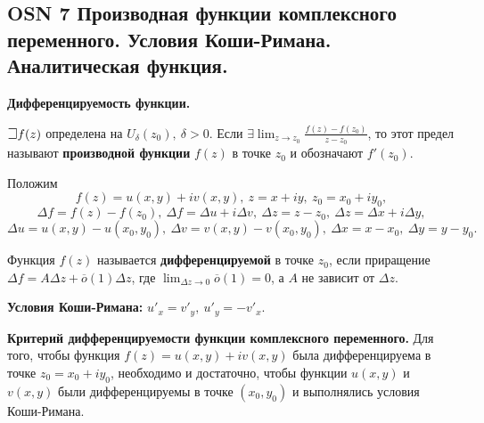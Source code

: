 \subsection*{OSN 7 Производная функции комплексного переменного. Условия Коши-Римана. Аналитическая  функция.}

\textbf{Дифференцируемость функции.}

$\mathLet f(z)$ определена на $U_{\delta}(z_0),~\delta > 0$. Если $\exists \displaystyle\lim_{z\to z_0} \frac{f(z) - f(z_0)}{z - z_0}$,
то этот предел называют \textbf{производной функции} $f(z)$ в точке $z_0$ и обозначают $f'(z_0)$.

Положим $$f(z) = u(x, y) + iv(x, y),~z = x + iy,~z_0 = x_0 + iy_0,$$
$$\Delta f = f(z)-f(z_0),~\Delta f = \Delta u + i\Delta v,~\Delta z = z- z_0,~\Delta z = \Delta x + i\Delta y,$$
$$\Delta u = u(x, y)-u(x_0, y_0),~\Delta v = v(x, y)-v(x_0, y_0),~\Delta x = x-x_0,~\Delta y = y- y_0.$$

Функция $f(z)$ называется \textbf{дифференцируемой} в точке $z_0$, если приращение $\Delta f = A\Delta z + \overline{o}(1)\Delta z$, где $\displaystyle\lim_{\Delta z\to0} \overline{o}(1) = 0$, а $A$ не зависит от $\Delta z$.

\textbf{Условия Коши-Римана:}
$u'_x = v'_y,~u'_y = -v'_x.$

\textbf{Критерий дифференцируемости функции комплексного переменного.}
Для того, чтобы функция $f(z) = u(x,y)+iv(x,y)$ была дифференцируема в точке $z_0 =x_0+iy_0$, необходимо и достаточно, чтобы функции $u(x,y)$ и $v(x,y)$ были дифференцируемы в точке $(x_0, y_0)$ и выполнялись условия Коши-Римана.

